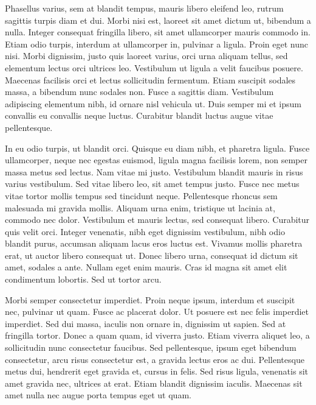 \documentclass[twoside]{ritsi/report}
\begin{document}
Phasellus varius, sem at blandit tempus, mauris libero eleifend leo, rutrum sagittis turpis diam et dui. Morbi nisi est, laoreet sit amet dictum ut, bibendum a nulla. Integer consequat fringilla libero, sit amet ullamcorper mauris commodo in. Etiam odio turpis, interdum at ullamcorper in, pulvinar a ligula. Proin eget nunc nisi. Morbi dignissim, justo quis laoreet varius, orci urna aliquam tellus, sed elementum lectus orci ultrices leo. Vestibulum ut ligula a velit faucibus posuere. Maecenas facilisis orci et lectus sollicitudin fermentum. Etiam suscipit sodales massa, a bibendum nunc sodales non. Fusce a sagittis diam. Vestibulum adipiscing elementum nibh, id ornare nisl vehicula ut. Duis semper mi et ipsum convallis eu convallis neque luctus. Curabitur blandit luctus augue vitae pellentesque.


In eu odio turpis, ut blandit orci. Quisque eu diam nibh, et pharetra ligula. Fusce ullamcorper, neque nec egestas euismod, ligula magna facilisis lorem, non semper massa metus sed lectus. Nam vitae mi justo. Vestibulum blandit mauris in risus varius vestibulum. Sed vitae libero leo, sit amet tempus justo. Fusce nec metus vitae tortor mollis tempus sed tincidunt neque. Pellentesque rhoncus sem malesuada mi gravida mollis. 
Aliquam urna enim, tristique ut lacinia at, commodo nec dolor. Vestibulum et mauris lectus, sed consequat libero. Curabitur quis velit orci. Integer venenatis, nibh eget dignissim vestibulum, nibh odio blandit purus, accumsan aliquam lacus eros luctus est. Vivamus mollis pharetra erat, ut auctor libero consequat ut. Donec libero urna, consequat id dictum sit amet, sodales a ante. Nullam eget enim mauris. Cras id magna sit amet elit condimentum lobortis. Sed ut tortor arcu.

Morbi semper consectetur imperdiet. Proin neque ipsum, interdum et suscipit nec, pulvinar ut quam. Fusce ac placerat dolor. Ut posuere est nec felis imperdiet imperdiet. Sed dui massa, iaculis non ornare in, dignissim ut sapien. Sed at fringilla tortor. Donec a quam quam, id viverra justo. Etiam viverra aliquet leo, a sollicitudin nunc consectetur faucibus. Sed pellentesque, ipsum eget bibendum consectetur, arcu risus consectetur est, a gravida lectus eros ac dui. Pellentesque metus dui, hendrerit eget gravida et, cursus in felis. Sed risus ligula, venenatis sit amet gravida nec, ultrices at erat. Etiam blandit dignissim iaculis. Maecenas sit amet nulla nec augue porta tempus eget ut quam.
\end{document}
